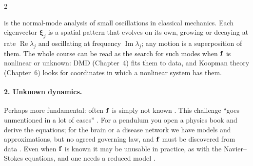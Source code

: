 \begin{paracol}{2}
\begin{intuition}
 is the normal-mode analysis of small oscillations in classical mechanics. Each
eigenvector $\boldsymbol\xi_j$ is a spatial pattern that evolves on its own, growing or decaying at rate
$\operatorname{Re}\lambda_j$ and oscillating at frequency $\operatorname{Im}\lambda_j$; any motion is
a superposition of them. The whole course can be read as the search for such modes when $\mathbf{f}$ is
nonlinear or unknown: DMD (Chapter~4) fits them to data, and Koopman theory (Chapter~6) looks for
coordinates in which a nonlinear system has them.
\end{intuition}

\paragraph{2. Unknown dynamics.} Perhaps more fundamental: often $\mathbf{f}$ is simply not known
. This challenge ``goes unmentioned in a lot of cases'' . For a pendulum
you open a physics book and derive the equations; for the brain or a disease network we have models
and approximations, but no agreed governing law, and $\mathbf{f}$ must be discovered from data
. Even when $\mathbf{f}$ is known it may be unusable in practice, as with the
Navier--Stokes equations, and one needs a reduced model .


\end{paracol}
